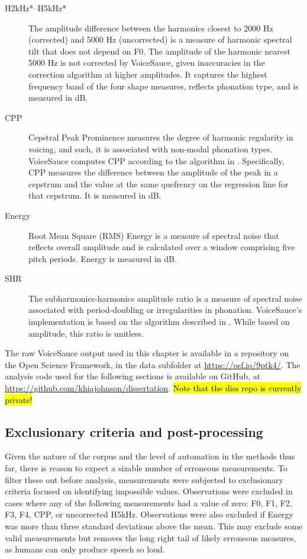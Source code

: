 \begin{description}
    \item[H2kHz*--H5kHz*] The amplitude difference between the harmonics closest to 2000 Hz (corrected) and 5000 Hz (uncorrected) is a measure of harmonic spectral tilt that does not depend on F0. The amplitude of the harmonic nearest 5000 Hz is not corrected by VoiceSauce, given inaccuracies in the correction algorithm at higher amplitudes. It captures the highest frequency band of the four shape measures, reflects phonation type, and is measured in dB.
    \item[CPP] Cepstral Peak Prominence measures the degree of harmonic regularity in voicing, and such, it is associated with non-modal phonation types. VoiceSauce computes CPP according to the algorithm in \citet{hillenbrand_1994_acoustic}. Specifically, CPP measures the difference between the amplitude of the peak in a cepstrum and the value at the same quefrency on the regression line for that cepstrum. It is measured in dB.
    \item[Energy] Root Mean Square (RMS) Energy is a measure of spectral noise that reflects overall amplitude and is calculated over a window comprising five pitch periods. Energy is measured in dB.
    \item[SHR] The subharmonics-harmonics amplitude ratio is a measure of spectral noise associated with period-doubling or irregularities in phonation. VoiceSauce's implementation is based on the algorithm described in \cite{sun_2002_shr}. While based on amplitude, this ratio is unitless. 
\end{description}

The raw VoiceSauce output used in this chapter is available in a repository on the Open Science Framework, in the data subfolder at \url{https://osf.io/9ptk4/}. The analysis code used for the following sections is available on GitHub, at \url{https://github.com/khiajohnson/dissertation}. \hl{Note that the diss repo is currently private!}


\subsection{Exclusionary criteria and post-processing}

Given the nature of the corpus and the level of automation in the methods thus far, there is reason to expect a sizable number of erroneous measurements. To filter these out before analysis, measurements were subjected to exclusionary criteria focused on identifying impossible values. Observations were excluded in cases where any of the following measurements had a value of zero: F0, F1, F2, F3, F4, CPP, or uncorrected H5kHz. Observations were also excluded if Energy was more than three standard deviations above the mean. This may exclude some valid measurements but removes the long right tail of likely erroneous measures, as humans can only produce speech so loud. 

